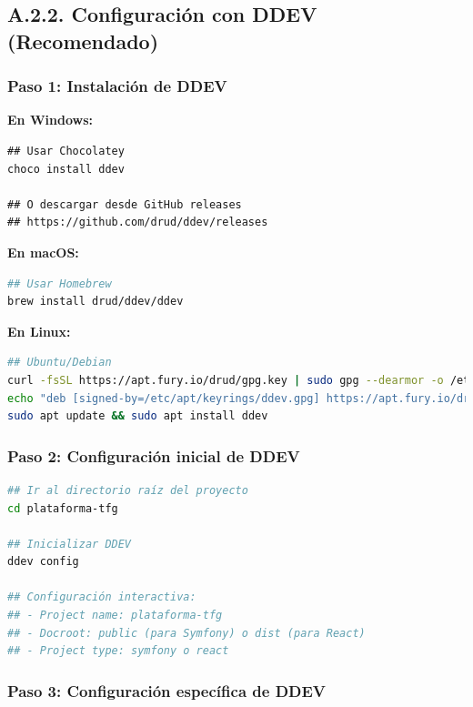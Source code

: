 \documentclass[12pt,a4paper,oneside]{report}
\begin{document}
\subsection{A.2.2. Configuración con DDEV
(Recomendado)}\label{a.2.2.-configuraciuxf3n-con-ddev-recomendado}

\subsubsection{Paso 1: Instalación de
DDEV}\label{paso-1-instalaciuxf3n-de-ddev}

\textbf{En Windows:}

\begin{lstlisting}
## Usar Chocolatey
choco install ddev

## O descargar desde GitHub releases
## https://github.com/drud/ddev/releases
\end{lstlisting}

\textbf{En macOS:}

\begin{lstlisting}[language=bash]
## Usar Homebrew
brew install drud/ddev/ddev
\end{lstlisting}

\textbf{En Linux:}

\begin{lstlisting}[language=bash]
## Ubuntu/Debian
curl -fsSL https://apt.fury.io/drud/gpg.key | sudo gpg --dearmor -o /etc/apt/keyrings/ddev.gpg
echo "deb [signed-by=/etc/apt/keyrings/ddev.gpg] https://apt.fury.io/drud/ * *" | sudo tee /etc/apt/sources.list.d/ddev.list
sudo apt update && sudo apt install ddev
\end{lstlisting}

\subsubsection{Paso 2: Configuración inicial de
DDEV}\label{paso-2-configuraciuxf3n-inicial-de-ddev}

\begin{lstlisting}[language=bash]
## Ir al directorio raíz del proyecto
cd plataforma-tfg

## Inicializar DDEV
ddev config

## Configuración interactiva:
## - Project name: plataforma-tfg
## - Docroot: public (para Symfony) o dist (para React)
## - Project type: symfony o react
\end{lstlisting}

\subsubsection{Paso 3: Configuración específica de
DDEV}\label{paso-3-configuraciuxf3n-especuxedfica-de-ddev}
\end{document}
